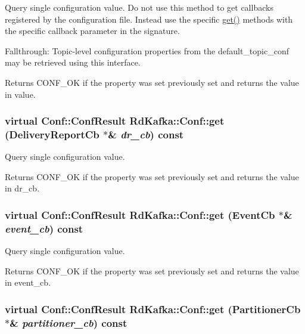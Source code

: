 Query single configuration value. Do not use this method to get callbacks registered by the configuration file. Instead use the specific \hyperlink{classRdKafka_1_1Conf_af72e23916fb598c0b343a1235392a723}{get()} methods with the specific callback parameter in the signature.

Fallthrough: Topic-\/level configuration properties from the {\ttfamily default\_\-topic\_\-conf} may be retrieved using this interface.

\begin{DoxyReturn}{Returns}
CONF\_\-OK if the property was set previously set and returns the value in {\ttfamily value}. 
\end{DoxyReturn}
\hypertarget{classRdKafka_1_1Conf_af013485a0645e4c61158c35c85b9439c}{
\subsubsection[{get}]{\setlength{\rightskip}{0pt plus 5cm}virtual {\bf Conf::ConfResult} RdKafka::Conf::get ({\bf DeliveryReportCb} $\ast$\& {\em dr\_\-cb}) const}}
\label{classRdKafka_1_1Conf_af013485a0645e4c61158c35c85b9439c}


Query single configuration value. \begin{DoxyReturn}{Returns}
CONF\_\-OK if the property was set previously set and returns the value in {\ttfamily dr\_\-cb}. 
\end{DoxyReturn}
\hypertarget{classRdKafka_1_1Conf_a29cb41ccd5c9e4270bf354a56c3d66c1}{
\subsubsection[{get}]{\setlength{\rightskip}{0pt plus 5cm}virtual {\bf Conf::ConfResult} RdKafka::Conf::get ({\bf EventCb} $\ast$\& {\em event\_\-cb}) const}}
\label{classRdKafka_1_1Conf_a29cb41ccd5c9e4270bf354a56c3d66c1}


Query single configuration value. \begin{DoxyReturn}{Returns}
CONF\_\-OK if the property was set previously set and returns the value in {\ttfamily event\_\-cb}. 
\end{DoxyReturn}
\hypertarget{classRdKafka_1_1Conf_a76a2aeb01ec7bf6c09e70fbc804ce2cc}{
\subsubsection[{get}]{\setlength{\rightskip}{0pt plus 5cm}virtual {\bf Conf::ConfResult} RdKafka::Conf::get ({\bf PartitionerCb} $\ast$\& {\em partitioner\_\-cb}) const}}
\label{classRdKafka_1_1Conf_a76a2aeb01ec7bf6c09e70fbc804ce2cc}


